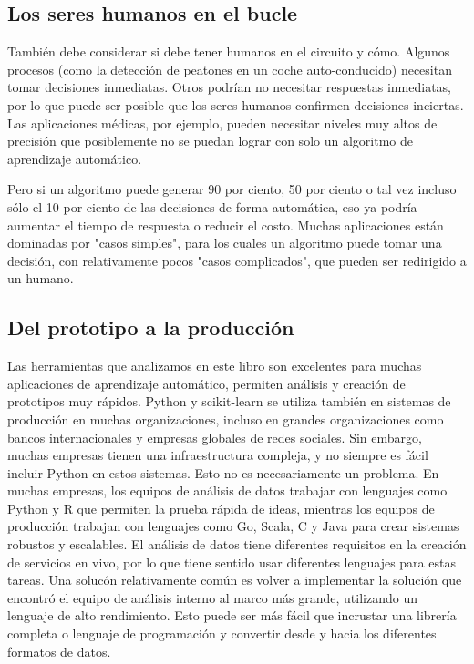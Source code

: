 \subsection{Los seres humanos en el bucle}

También debe considerar si debe tener humanos en el circuito y cómo.   Algunos procesos (como la detección de peatones en un coche auto-conducido) necesitan tomar decisiones inmediatas.
Otros podrían no necesitar respuestas inmediatas, por lo que puede ser posible que los seres humanos confirmen decisiones inciertas.  Las aplicaciones médicas, por ejemplo, pueden necesitar niveles muy altos de precisión  que posiblemente no se puedan lograr con solo un algoritmo de aprendizaje automático. 

Pero si un algoritmo puede generar 90 por ciento, 50 por ciento o tal vez incluso
sólo el 10 por ciento de las decisiones de forma automática, eso ya podría aumentar el tiempo de respuesta
o reducir el costo.  Muchas aplicaciones están dominadas por "{}casos simples"{}, para los cuales un algoritmo puede tomar una decisión, con relativamente pocos "{}casos complicados"{}, que pueden ser
redirigido a un humano.
	
\subsection{Del prototipo a la producción}

Las herramientas que analizamos en este libro son excelentes para muchas aplicaciones de aprendizaje automático,  permiten análisis y creación de prototipos muy rápidos.
Python y {\ttfamily scikit-learn} se utiliza también   en sistemas de producción en muchas organizaciones, incluso en grandes organizaciones como  bancos internacionales y empresas globales de redes sociales. Sin embargo, muchas empresas tienen una infraestructura compleja, y no siempre es fácil incluir Python en estos sistemas.  
Esto no es necesariamente un problema. En muchas empresas, los equipos de análisis de datos
trabajar con lenguajes como Python y R que permiten la prueba rápida de ideas, mientras
los equipos de producción trabajan con lenguajes como Go, Scala, C\!{\scriptsize ++}  y Java para crear
sistemas robustos y  escalables.  El análisis de datos tiene  diferentes requisitos  en la creación de servicios en vivo,
por lo que tiene sentido usar diferentes lenguajes para estas tareas. Una solucón 
relativamente común  es volver a implementar la solución que encontró el equipo 
de análisis interno al marco más grande, utilizando un lenguaje de alto rendimiento. 
Esto puede ser más fácil que incrustar una librería  completa o lenguaje de programación
 y convertir desde y hacia los diferentes formatos de datos.\\




